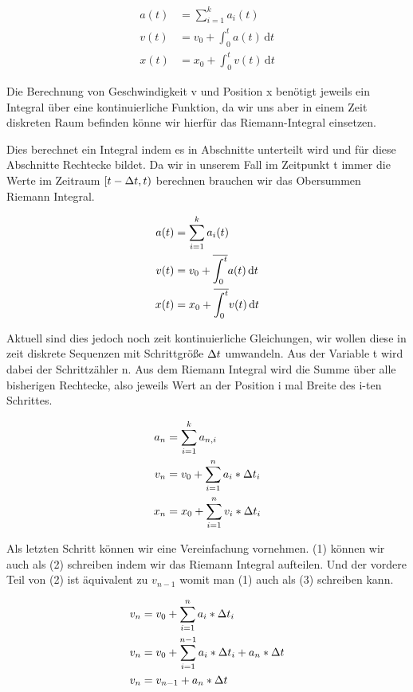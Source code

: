 \begin{align*}
  a(t) &= \sum_{i=1}^{k}{a_i(t)}  \\
  v(t) &= v_0 + \int_0^t {a(t)}\,\mathrm{d}t  \\
  x(t) &= x_0 + \int_0^t {v(t)}\,\mathrm{d}t
\end{align*}

Die Berechnung von Geschwindigkeit v und Position x benötigt jeweils ein Integral über eine kontinuierliche Funktion, da wir uns aber in einem Zeit diskreten Raum befinden könne wir hierfür das Riemann-Integral einsetzen\cite{RINT}.



Dies berechnet ein Integral indem es in Abschnitte unterteilt wird und für diese Abschnitte Rechtecke bildet. Da wir in unserem Fall im Zeitpunkt t immer die Werte im Zeitraum $[t - \Delta t , t)$ berechnen brauchen wir das Obersummen Riemann Integral.

\begin{align*}
  a(t) &= \sum_{i=1}^{k}{a_i(t)}  \\
  v(t) &= v_0 + \overline{\int_{0}^{t}} a(t)\,\mathrm{d}t  \\
  x(t) &= x_0 + \overline{\int_{0}^{t}} v(t)\,\mathrm{d}t
\end{align*}

Aktuell sind dies jedoch noch zeit kontinuierliche Gleichungen, wir wollen diese in zeit diskrete Sequenzen mit Schrittgröße $\Delta t$ umwandeln. Aus der Variable t wird dabei der Schrittzähler n. Aus dem Riemann Integral wird die Summe über alle bisherigen Rechtecke, also jeweils Wert an der Position i mal Breite des i-ten Schrittes.

\begin{align*}
  a_n &= \sum_{i=1}^{k}{a_{n, i}}  \\
  v_n &= v_0 + \sum_{i=1}^{n}{a_i * \Delta t_i}  \\
  x_n &= x_0 + \sum_{i=1}^{n}{v_i * \Delta t_i}
\end{align*}

Als letzten Schritt können wir eine Vereinfachung vornehmen. (1) können wir auch als (2) schreiben indem wir das Riemann Integral aufteilen. Und der vordere Teil von (2) ist äquivalent zu $v_{n-1}$ womit man (1) auch als (3) schreiben kann. 

\begin{align}
  v_n &= v_0 + \sum_{i=1}^{n}{a_i * \Delta t_i}  \\
  v_n &= v_0 + \sum_{i=1}^{n-1}{a_i * \Delta t_i} + a_n * \Delta t  \\
  v_n &= v_{n-1} + a_n * \Delta t
\end{align}

